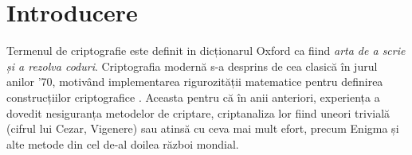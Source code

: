 \documentclass[oneside, 12pt]{book}
\begin{document}
\setcounter{tocdepth}{2}
\tableofcontents








\chapter*{Introducere}

Termenul de criptografie este definit in dicționarul Oxford ca fiind \textit{arta de a scrie și a rezolva coduri}.
Criptografia modernă s-a desprins de cea clasică în jurul anilor '70, motivând implementarea rigurozității matematice pentru definirea construcțiilor criptografice \cite{diffie1976new}. Aceasta pentru că în anii anteriori, experiența a dovedit nesiguranța metodelor de criptare, criptanaliza lor fiind uneori trivială (cifrul lui Cezar, Vigenere) sau atinsă cu ceva mai mult efort, precum Enigma și alte metode din cel de-al doilea război mondial.
\end{document}

